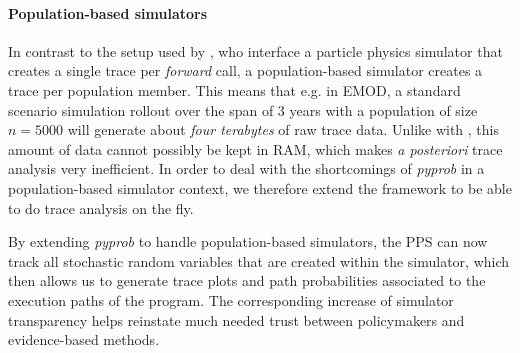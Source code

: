 \documentclass{article}
\begin{document}
\paragraph{Population-based simulators} In contrast to the setup used by \cite{baydin2018efficient}, who interface a particle physics simulator that creates a single trace per \textit{forward} call, a population-based simulator creates a trace per population member. This means that e.g. in EMOD, a standard scenario simulation rollout over the span of $3$ years  
with a population of size $n=5000$ \cite{smith2008towards} will generate about \textit{four terabytes} of raw trace data. Unlike with \citep{baydin2018efficient}, this amount of data cannot possibly be kept in RAM, which makes \textit{a posteriori} trace analysis very inefficient. 
In order to deal with the shortcomings of \textit{pyprob} in a population-based simulator context, we therefore extend the framework to be able to do trace analysis on the fly.

By extending \textit{pyprob} to handle population-based simulators, the PPS can now track all stochastic random variables that are created within the simulator, which then allows us to generate trace plots and path probabilities associated to the execution paths of the program.
The corresponding increase of simulator transparency helps reinstate much needed trust between policymakers and evidence-based methods.
\end{document}
